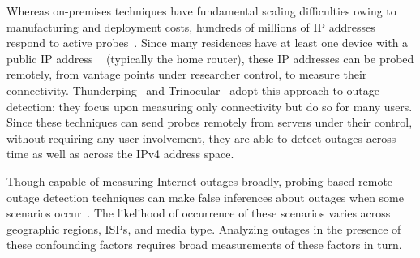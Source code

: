 Whereas on-premises techniques have fundamental scaling
difficulties owing to manufacturing and deployment costs, hundreds of
millions of IP addresses respond to active
probes~\cite{timeouts}. Since many residences have at least one device
with a public IP address ~\cite{cgn-imc16} (typically the home
router), these IP addresses can be probed remotely, from vantage
points under researcher control, to measure their
connectivity. Thunderping~\cite{pingin} and
Trinocular~\cite{trinocular} adopt this approach to outage detection:
they focus upon measuring only connectivity but do so for many
users. Since these techniques can send probes remotely from servers
under their control, without requiring any user involvement, they are
able to detect outages across time as well as across the IPv4 address
space.



Though capable of measuring Internet outages broadly, probing-based
remote outage detection techniques can make false inferences about
outages when some scenarios occur~\cite{timeouts,
addrchange-reasons}. The likelihood of occurrence of these scenarios
varies across geographic regions, ISPs, and media type. Analyzing
outages in the presence of these confounding factors requires broad
measurements of these factors in turn.




